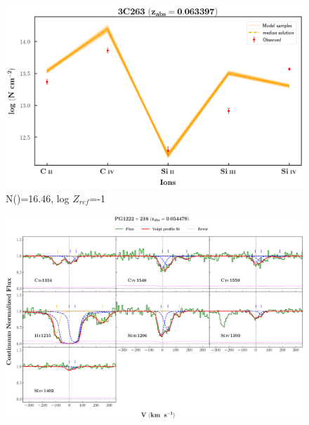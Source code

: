 \documentclass[12pt,draft]{report}
\newcommand\ion[2]{\text{#1\,\textsc{\lowercase{#2}}}}
\begin{document}
\begin{figure}[!htbp]
    \centering
    \includegraphics[width=1\linewidth]{Ionisation-Modelling-Plots/3c263-z=0.063397-compIV_logZ=-1.png}
    \caption{N(\ion{H}{i})=16.46, log $Z_{ref}$=-1}
\end{figure}



\newpage

\begin{landscape}

\begin{figure}
    \centering
    \vspace{-20mm}
    \hspace*{-35mm}
    \includegraphics[width=1.25\linewidth]{System-Plots/PG1222+216_z=0.054479_sys_plot.png}
\end{figure}

\end{landscape}
\end{document}

